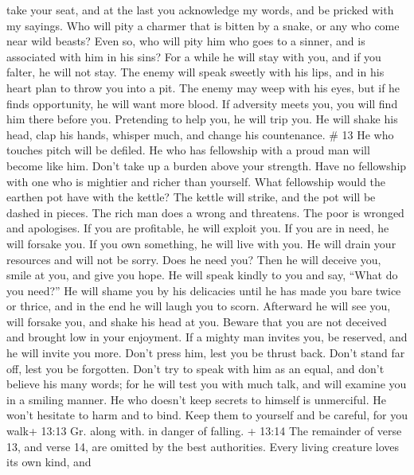 take your seat, and at the last you acknowledge my words, and be pricked
with my sayings.  Who will pity a charmer that is bitten by
a snake, or any who come near wild beasts?  Even so, who
will pity him who goes to a sinner, and is associated with him in his
sins?  For a while he will stay with you, and if you
falter, he will not stay.  The enemy will speak sweetly
with his lips, and in his heart plan to throw you into a pit. The enemy
may weep with his eyes, but if he finds opportunity, he will want more
blood.  If adversity meets you, you will find him there
before you. Pretending to help you, he will trip you.  He
will shake his head, clap his hands, whisper much, and change his
countenance. \# 13  He who touches pitch will be defiled. He
who has fellowship with a proud man will become like him. 
Don't take up a burden above your strength. Have no fellowship with one
who is mightier and richer than yourself. What fellowship would the
earthen pot have with the kettle? The kettle will strike, and the pot
will be dashed in pieces.  The rich man does a wrong and
threatens. The poor is wronged and apologises.  If you are
profitable, he will exploit you. If you are in need, he will forsake
you.  If you own something, he will live with you. He will
drain your resources and will not be sorry.  Does he need
you? Then he will deceive you, smile at you, and give you hope. He will
speak kindly to you and say, ``What do you need?''  He will
shame you by his delicacies until he has made you bare twice or thrice,
and in the end he will laugh you to scorn. Afterward he will see you,
will forsake you, and shake his head at you.  Beware that
you are not deceived and brought low in your enjoyment.  If
a mighty man invites you, be reserved, and he will invite you more.
 Don't press him, lest you be thrust back. Don't stand far
off, lest you be forgotten.  Don't try to speak with him as
an equal, and don't believe his many words; for he will test you with
much talk, and will examine you in a smiling manner.  He
who doesn't keep secrets to himself is unmerciful. He won't hesitate to
harm and to bind.  Keep them to yourself and be careful,
for you walk+ 13:13 Gr. along with. in danger of falling. 
+ 13:14 The remainder of verse 13, and verse 14, are omitted by the best
authorities.  Every living creature loves its own kind, and
